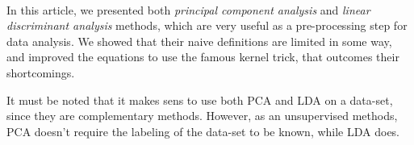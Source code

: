 \paragraph{}
In this article, we presented both \emph{principal component analysis} and \emph{linear discriminant analysis} methods, which are very useful as a pre-processing step for data analysis. We showed that their naive definitions are limited in some way, and improved the equations to use the famous kernel trick, that outcomes their shortcomings.

It must be noted that it makes sens to use both PCA and LDA on a data-set, since they are complementary methods. However, as an unsupervised methods, PCA doesn't require the labeling of the data-set to be known, while LDA does.
